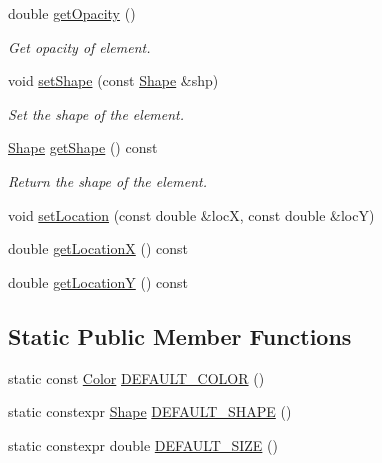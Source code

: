\begin{DoxyCompactItemize}
\item 
double \hyperlink{classbridges_1_1datastructure_1_1_element_visualizer_af403e841efd1dab3669fdda2fd927f99}{get\+Opacity} ()
\begin{DoxyCompactList}\small\item\em Get opacity of element. \end{DoxyCompactList}\item 
void \hyperlink{classbridges_1_1datastructure_1_1_element_visualizer_a316cccfc1e75ccbfdfe6d68da824b8b3}{set\+Shape} (const \hyperlink{namespacebridges_1_1datastructure_a3408f5f44d9c6062e5f3adb7e1bbb7f0}{Shape} \&shp)
\begin{DoxyCompactList}\small\item\em Set the shape of the element. \end{DoxyCompactList}\item 
\hyperlink{namespacebridges_1_1datastructure_a3408f5f44d9c6062e5f3adb7e1bbb7f0}{Shape} \hyperlink{classbridges_1_1datastructure_1_1_element_visualizer_a3b1dd1d61f43844142adce1f0bd03dcf}{get\+Shape} () const
\begin{DoxyCompactList}\small\item\em Return the shape of the element. \end{DoxyCompactList}\item 
void \hyperlink{classbridges_1_1datastructure_1_1_element_visualizer_ae980cb185ddb11ecd1cebeb4834734bf}{set\+Location} (const double \&locX, const double \&locY)
\item 
double \hyperlink{classbridges_1_1datastructure_1_1_element_visualizer_a8ee6ac3a3b03194d51cfbc08a1360b5d}{get\+LocationX} () const
\item 
double \hyperlink{classbridges_1_1datastructure_1_1_element_visualizer_a6012c9545e56e6210b6a6485873a5c92}{get\+LocationY} () const
\end{DoxyCompactItemize}
\subsection*{Static Public Member Functions}
\begin{DoxyCompactItemize}
\item 
static const \hyperlink{classbridges_1_1datastructure_1_1_color}{Color} \hyperlink{classbridges_1_1datastructure_1_1_element_visualizer_a777a0295e8216e403108a6c90ce6790b}{D\+E\+F\+A\+U\+L\+T\+\_\+\+C\+O\+L\+OR} ()
\item 
static constexpr \hyperlink{namespacebridges_1_1datastructure_a3408f5f44d9c6062e5f3adb7e1bbb7f0}{Shape} \hyperlink{classbridges_1_1datastructure_1_1_element_visualizer_adfba1c4d4f04ff92545d932bfce5b9d1}{D\+E\+F\+A\+U\+L\+T\+\_\+\+S\+H\+A\+PE} ()
\item 
static constexpr double \hyperlink{classbridges_1_1datastructure_1_1_element_visualizer_afa0fa3f844171f311c3d9c9025a826c5}{D\+E\+F\+A\+U\+L\+T\+\_\+\+S\+I\+ZE} ()
\end{DoxyCompactItemize}


